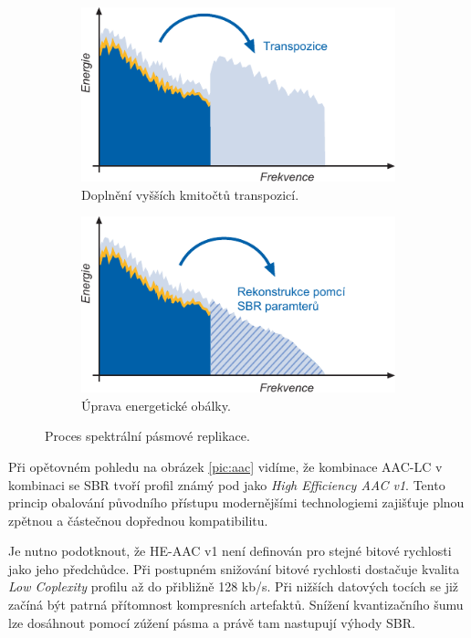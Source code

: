 \begin{figure}[h]
    \centering
    \begin{subfigure}{.5\textwidth}
        \centering
        \includegraphics[width=1\linewidth]{pic/sbr1.pdf}
        \caption{Doplnění vyšších kmitočtů transpozicí.}
        \label{fig:sub1}
    \end{subfigure}%
    \begin{subfigure}{.5\textwidth}
        \centering
        \includegraphics[width=1\linewidth]{pic/sbr2.pdf}
        \caption{Úprava energetické obálky.}
        \label{fig:sub2}
    \end{subfigure}
    \caption{Proces spektrální pásmové replikace.\cite{article:aac}} 
\label{pic:sbr}
\end{figure}
    
Při opětovném pohledu na obrázek \ref{pic:aac} vidíme, že kombinace AAC-LC v kombinaci se SBR tvoří profil známý pod jako \textit{High Efficiency AAC v1}. Tento princip obalování původního přístupu modernějšími technologiemi zajišťuje plnou zpětnou a částečnou dopřednou kompatibilitu.

Je nutno podotknout, že HE-AAC v1 není definován pro stejné bitové rychlosti jako jeho předchůdce. Při postupném snižování bitové rychlosti dostačuje kvalita \textit{Low Coplexity} profilu až do přibližně 128 kb/s. Při nižších datových tocích se již začíná být patrná přítomnost kompresních artefaktů. Snížení kvantizačního šumu lze dosáhnout pomocí zúžení pásma a právě tam nastupují výhody SBR.
    
